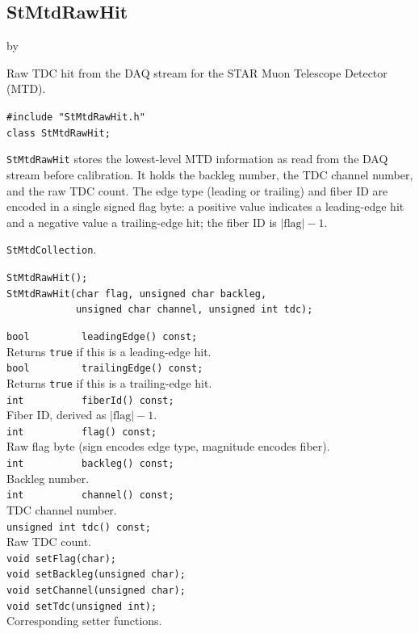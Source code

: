 \documentclass[twoside]{article}
\newcommand{\entrylabel}[1]{\mbox{\textbf{{#1}}}\hfil}%
\newenvironment{entry}
{\begin{list}{}%
    {\renewcommand{\makelabel}{\entrylabel}%
     \setlength{\labelwidth}{90pt}%
     \setlength{\leftmargin}{\labelwidth}
     \advance\leftmargin by \labelsep%
      }%
    }%
  {\end{list}}
\newcommand{\Entrylabel}[1]%
{\raisebox{0pt}[1ex][0pt]{\makebox[\labelwidth][l]%
    {\parbox[t]{\labelwidth}{\hspace{0pt}\textbf{{#1}}}}}}
\newenvironment{Entry}%
{\renewcommand{\entrylabel}{\Entrylabel}\begin{entry}}%
  {\end{entry}}
\begin{document}
\subsection{StMtdRawHit}
\label{sec:StMtdRawHit}
\begin{Entry}
\item[Summary] Raw TDC hit from the DAQ stream for the STAR Muon Telescope
    Detector (MTD).
\item[Synopsis]
    \verb+#include "StMtdRawHit.h"+\\
    \verb+class StMtdRawHit;+\\
\item[Description]
    \texttt{StMtdRawHit} stores the lowest-level MTD information as read from
    the DAQ stream before calibration.  It holds the backleg number, the TDC
    channel number, and the raw TDC count.  The edge type (leading or
    trailing) and fiber ID are encoded in a single signed flag byte: a
    positive value indicates a leading-edge hit and a negative value a
    trailing-edge hit; the fiber ID is $|\text{flag}|-1$.
\item[Related Classes]
    \texttt{StMtdCollection}.
\item[Public\\ Constructors]
    \verb+StMtdRawHit();+\\
    \verb+StMtdRawHit(char flag, unsigned char backleg,+\\
    \verb+            unsigned char channel, unsigned int tdc);+\\
\item[Public Member\\ Functions]
    \verb+bool         leadingEdge() const;+\\
    Returns \verb+true+ if this is a leading-edge hit.\\
    \verb+bool         trailingEdge() const;+\\
    Returns \verb+true+ if this is a trailing-edge hit.\\
    \verb+int          fiberId() const;+\\
    Fiber ID, derived as $|\text{flag}|-1$.\\
    \verb+int          flag() const;+\\
    Raw flag byte (sign encodes edge type, magnitude encodes fiber).\\
    \verb+int          backleg() const;+\\
    Backleg number.\\
    \verb+int          channel() const;+\\
    TDC channel number.\\
    \verb+unsigned int tdc() const;+\\
    Raw TDC count.\\
    \verb+void setFlag(char);+\\
    \verb+void setBackleg(unsigned char);+\\
    \verb+void setChannel(unsigned char);+\\
    \verb+void setTdc(unsigned int);+\\
    Corresponding setter functions.\\
\end{Entry}
\clearpage
\end{document}
